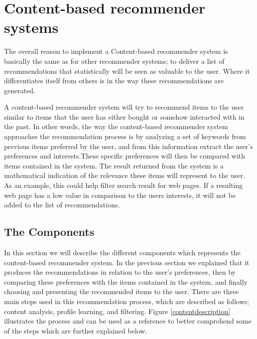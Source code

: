 \section{Content-based recommender systems}
\label{sec:content}
The overall reason to implement a Content-based recommender system is basically the same as for other recommender systems; to deliver a list of recommendations that statistically will be seen as valuable to the user. Where it differentiates itself from others is in the way these recommendations are generated.\newline 

A content-based recommender system will try to recommend items to the user similar to items that the user has either bought or somehow interacted with in the past. In other words, the way the content-based recommender system approaches the recommendation process is by analyzing a set of keywords from previous items preferred by the user, and from this information extract the user's preferences and interests.These specific preferences will then be compared with items contained in the system.\newline
The result returned from the system is a mathematical indication of the relevance these items will represent to the user. As an example, this could help filter search result for web pages. If a resulting web page has a low value in comparison to the users interests, it will not be added to the list of recommendations.
\subsection{The Components}
In this section we will describe the different components which represents the content-based recommender system. In the previous section we explained that it produces the recommendations in relation to the user's preferences, then by comparing these preferences with the items contained in the system, and finally choosing and presenting the recommended items to the user. \newline
There are three main steps used in this recommendation process, which are described as follows; content analysis, profile learning, and filtering. Figure \ref{contentdescription} illustrates the process and can be used as a reference to better comprehend some of the steps which are further explained below.


